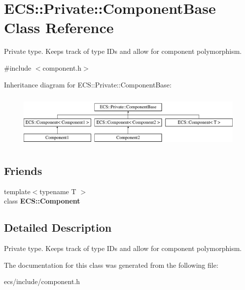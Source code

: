\hypertarget{class_e_c_s_1_1_private_1_1_component_base}{\section{E\-C\-S\-:\-:Private\-:\-:Component\-Base Class Reference}
\label{class_e_c_s_1_1_private_1_1_component_base}
}


Private type. Keeps track of type I\-Ds and allow for component polymorphism.  




{\ttfamily \#include $<$component.\-h$>$}

Inheritance diagram for E\-C\-S\-:\-:Private\-:\-:Component\-Base\-:\begin{figure}[H]
\begin{center}
\leavevmode
\includegraphics[height=2.692308cm]{class_e_c_s_1_1_private_1_1_component_base}
\end{center}
\end{figure}
\subsection*{Friends}
\begin{DoxyCompactItemize}
\item 
\hypertarget{class_e_c_s_1_1_private_1_1_component_base_a8201bf3780452dd2c643fdd6bdf77155}{{\footnotesize template$<$typename T $>$ }\\class {\bfseries E\-C\-S\-::\-Component}}\label{class_e_c_s_1_1_private_1_1_component_base_a8201bf3780452dd2c643fdd6bdf77155}

\end{DoxyCompactItemize}


\subsection{Detailed Description}
Private type. Keeps track of type I\-Ds and allow for component polymorphism. 

The documentation for this class was generated from the following file\-:\begin{DoxyCompactItemize}
\item 
ecs/include/component.\-h\end{DoxyCompactItemize}
